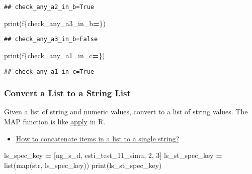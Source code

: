 \documentclass[
]{book}
\newenvironment{Shaded}{\begin{snugshade}}{\end{snugshade}}
\newcommand{\BuiltInTok}[1]{#1}
\newcommand{\DecValTok}[1]{\textcolor[rgb]{0.00,0.00,0.81}{#1}}
\newcommand{\NormalTok}[1]{#1}
\newcommand{\OperatorTok}[1]{\textcolor[rgb]{0.81,0.36,0.00}{\textbf{#1}}}
\newcommand{\SpecialCharTok}[1]{\textcolor[rgb]{0.00,0.00,0.00}{#1}}
\newcommand{\SpecialStringTok}[1]{\textcolor[rgb]{0.31,0.60,0.02}{#1}}
\newcommand{\StringTok}[1]{\textcolor[rgb]{0.31,0.60,0.02}{#1}}
\providecommand{\tightlist}{%
  \setlength{\itemsep}{0pt}\setlength{\parskip}{0pt}}
\begin{document}
\begin{verbatim}
## check_any_a2_in_b=True
\end{verbatim}

\begin{Shaded}
\begin{Highlighting}[]
\BuiltInTok{print}\NormalTok{(}\SpecialStringTok{f\textquotesingle{}}\SpecialCharTok{\{}\NormalTok{check\_any\_a3\_in\_b}\OperatorTok{=}\SpecialCharTok{\}}\SpecialStringTok{\textquotesingle{}}\NormalTok{)}
\end{Highlighting}
\end{Shaded}

\begin{verbatim}
## check_any_a3_in_b=False
\end{verbatim}

\begin{Shaded}
\begin{Highlighting}[]
\BuiltInTok{print}\NormalTok{(}\SpecialStringTok{f\textquotesingle{}}\SpecialCharTok{\{}\NormalTok{check\_any\_a1\_in\_c}\OperatorTok{=}\SpecialCharTok{\}}\SpecialStringTok{\textquotesingle{}}\NormalTok{)}
\end{Highlighting}
\end{Shaded}

\begin{verbatim}
## check_any_a1_in_c=True
\end{verbatim}

\hypertarget{convert-a-list-to-a-string-list}{%
\subsubsection{Convert a List to a String List}\label{convert-a-list-to-a-string-list}}

Given a list of string and numeric values, convert to a list of string values. The MAP function is like \href{https://fanwangecon.github.io/R4Econ/function/noloop/htmlpdfr/fs_apply.html}{apply} in R.

\begin{itemize}
\tightlist
\item
  \href{https://stackoverflow.com/a/34011944/8280804}{How to concatenate items in a list to a single string?}
\end{itemize}

\begin{Shaded}
\begin{Highlighting}[]
\NormalTok{ls\_spec\_key }\OperatorTok{=}\NormalTok{ [}\StringTok{\textquotesingle{}ng\_s\_d\textquotesingle{}}\NormalTok{, }\StringTok{\textquotesingle{}esti\_test\_11\_simu\textquotesingle{}}\NormalTok{, }\DecValTok{2}\NormalTok{, }\DecValTok{3}\NormalTok{]}
\NormalTok{ls\_st\_spec\_key }\OperatorTok{=} \BuiltInTok{list}\NormalTok{(}\BuiltInTok{map}\NormalTok{(}\BuiltInTok{str}\NormalTok{, ls\_spec\_key))}
\BuiltInTok{print}\NormalTok{(ls\_st\_spec\_key)}
\end{Highlighting}
\end{Shaded}
\end{document}
